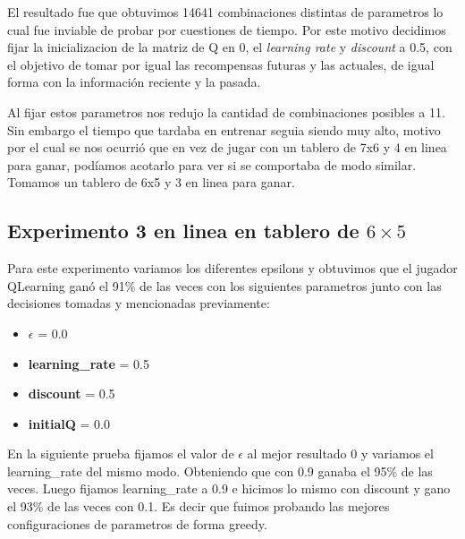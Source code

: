 El resultado fue que obtuvimos 14641 combinaciones distintas de parametros lo cual fue inviable de probar por cuestiones
 de tiempo. Por este motivo decidimos fijar la inicializacion de la matriz de Q en 0, el \textit{learning rate} y
  \textit{discount} a 0.5, con el objetivo de tomar por igual las recompensas futuras y las actuales, de igual forma
   con la información reciente y la pasada. 

Al fijar estos parametros nos redujo la cantidad de combinaciones posibles a 11. Sin embargo el tiempo que tardaba en entrenar
 seguia siendo muy alto, motivo por el cual se nos ocurrió que en vez de jugar con un tablero de 7x6 y 4 en linea para ganar,
  podíamos acotarlo para ver si se comportaba de modo similar. Tomamos un tablero de 6x5 y 3 en linea para ganar.



\subsection{Experimento 3 en linea en tablero de $6\times5$}
Para este experimento variamos los diferentes epsilons y obtuvimos que el jugador QLearning ganó el 91\% de las veces con los
siguientes parametros junto con las decisiones tomadas y mencionadas previamente: \\

\begin{itemize}
  \item  \textbf{$\epsilon$} = 0.0
  \item \textbf{learning\_rate} = 0.5
  \item \textbf{discount} = 0.5
  \item \textbf{initialQ} = 0.0
\end{itemize}



En la siguiente prueba fijamos el valor de $\epsilon$ al mejor resultado 0 y  variamos el learning\_rate del mismo modo.
Obteniendo que con 0.9 ganaba el 95\% de las veces. Luego fijamos learning\_rate a 0.9 e hicimos lo mismo con discount y
gano el 93\% de las veces con 0.1. Es decir que fuimos probando las mejores configuraciones de parametros de forma greedy.


